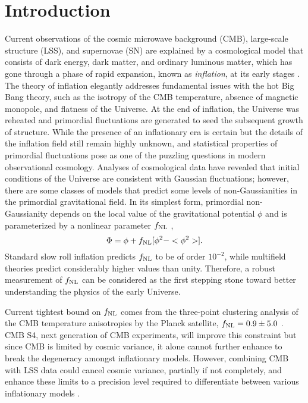 \section{Introduction}
\label{sec:introduction}
Current observations of the cosmic microwave background (CMB), large-scale structure (LSS), and supernovae (SN) are explained by a cosmological model that consists of dark energy, dark matter, and ordinary luminous matter, which has gone through a phase of rapid expansion, known as \textit{inflation},  at its early stages \citep[see, e.g.,][]{weinberg2013observational}. The theory of inflation elegantly addresses fundamental issues with the hot Big Bang theory, such as the isotropy of the CMB temperature, absence of magnetic monopole, and flatness of the Universe. At the end of inflation, the Universe was reheated and primordial fluctuations are generated to seed the subsequent growth of structure. While the presence of an inflationary era is certain but the details of the inflation field still remain highly unknown, and statistical properties of primordial fluctuations pose as one of the puzzling questions in modern observational cosmology. Analyses of cosmological data have revealed that initial conditions of the Universe are consistent with Gaussian fluctuations; however, there are some classes of models that predict some levels of non-Gaussianities in the primordial gravitational field. In its simplest form, primordial non-Gaussianity depends on the local value of the gravitational potential $\phi$ and is parameterized by a nonlinear parameter $f_{\rm NL}$ \citep{komatsu2001acoustic},
\begin{equation}
    \Phi = \phi + f_{\rm NL} [\phi^{2} -  <\phi^{2}>].
\end{equation}
Standard slow roll inflation predicts $f_{\rm NL}$ to be of order $10^{-2}$, while multifield theories predict considerably higher values than unity. Therefore, a robust measurement of $f_{\rm NL}$ can be considered as the first stepping stone toward better understanding the physics of the early Universe. 

Current tightest bound on $f_{\rm NL}$ comes from the three-point clustering analysis of the CMB temperature anisotropies by the Planck satellite, $f_{\rm NL}=0.9\pm 5.0$ \citep{akrami2019planck}. CMB S4, next generation of CMB experiments, will improve this constraint but since CMB is limited by cosmic variance, it alone cannot further enhance to break the degeneracy amongst inflationary models. However, combining CMB with LSS data could cancel cosmic variance, partially if not completely, and enhance these limits to a precision level required to differentiate between various inflationary models \citep[see, e.g.,][]{schmittfull2018PhRvD}.  

